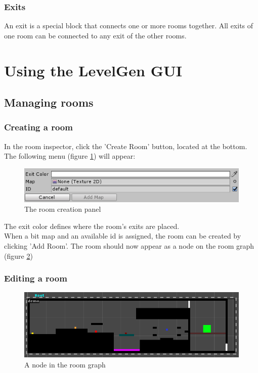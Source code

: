 \documentclass[a4paper]{article}
\begin{document}
	\subsubsection{Exits}
	An exit is a special block that connects one or more rooms together. All exits of one room can be connected to any exit of the other rooms.
	
	\newpage
	
	\section{Using the LevelGen GUI}
	\subsection{Managing rooms}
	\subsubsection{Creating a room}
	In the room inspector, click the 'Create Room' button, located at the bottom. The following menu (figure \ref{fig:create_room}) will appear:
	
	\begin{figure}[h]
		\includegraphics[width=\linewidth]{img/Menu_CreateRoom.PNG}
		\caption{The room creation panel}
		\label{fig:create_room}
	\end{figure}

	The exit color defines where the room's exits are placed. 
	\\When a bit map and an available id is assigned, the room can be created by clicking 'Add Room'. The room should now appear as a node on the room graph (figure \ref{fig:node_room})
	
	\subsubsection{Editing a room}
	\begin{figure}[h]
		\includegraphics[width=\linewidth]{img/Node_Room.PNG}
		\caption{A node in the room graph}
		\label{fig:node_room}
	\end{figure}
	
\end{document}
